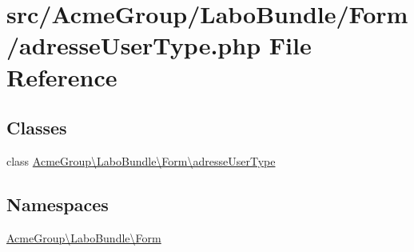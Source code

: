 \hypertarget{adresse_user_type_8php}{\section{src/\+Acme\+Group/\+Labo\+Bundle/\+Form/adresse\+User\+Type.php File Reference}
\label{adresse_user_type_8php}
}
\subsection*{Classes}
\begin{DoxyCompactItemize}
\item 
class \hyperlink{class_acme_group_1_1_labo_bundle_1_1_form_1_1adresse_user_type}{Acme\+Group\textbackslash{}\+Labo\+Bundle\textbackslash{}\+Form\textbackslash{}adresse\+User\+Type}
\end{DoxyCompactItemize}
\subsection*{Namespaces}
\begin{DoxyCompactItemize}
\item 
 \hyperlink{namespace_acme_group_1_1_labo_bundle_1_1_form}{Acme\+Group\textbackslash{}\+Labo\+Bundle\textbackslash{}\+Form}
\end{DoxyCompactItemize}
